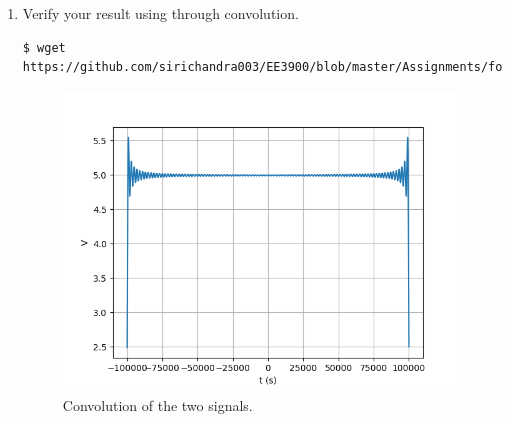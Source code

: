 \documentclass[journal,12pt,twocolumn]{IEEEtran}
\renewcommand\thesection{\arabic{section}}
\begin{document}
\begin{enumerate}[label=\thesection.\arabic*
,ref=\thesection.\theenumi]
\item Verify your result using through convolution. \\
\solution 
\begin{lstlisting}
$ wget https://github.com/sirichandra003/EE3900/blob/master/Assignments/fourier%20series/codes/4.3.py
\end{lstlisting}
\begin{figure}[!ht]
\includegraphics[width=\columnwidth]{figs/4.3.png}
\caption{Convolution of the two signals.}
\label{eq:fig-conv}
\end{figure}
\end{enumerate}
\end{document}
